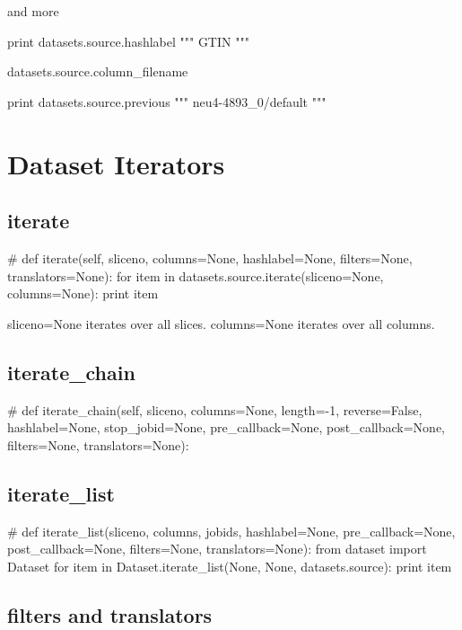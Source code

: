 and more

\begin{python}
  print datasets.source.hashlabel
  """
GTIN
"""
\end{python}
\begin{python}
datasets.source.column\_filename
\end{python}

\begin{python}
  print datasets.source.previous
  """
neu4-4893_0/default
"""
\end{python}




\section{Dataset Iterators}

\subsection{iterate}
\begin{python}
# def iterate(self, sliceno, columns=None, hashlabel=None, filters=None, translators=None):
  for item in datasets.source.iterate(sliceno=None, columns=None):
    print item
\end{python}
sliceno=None iterates over all slices.
columns=None iterates over all columns.

\subsection{iterate\_chain}
\begin{python}
# def iterate_chain(self, sliceno, columns=None, length=-1, reverse=False, hashlabel=None, stop_jobid=None, pre_callback=None, post_callback=None, filters=None, translators=None):
\end{python}



\subsection{iterate\_list}
\begin{python}
  # def iterate_list(sliceno, columns, jobids, hashlabel=None, pre_callback=None, post_callback=None, filters=None, translators=None):
  from dataset import Dataset
  for item in Dataset.iterate_list(None, None, datasets.source):
    print item
\end{python}

\subsection{filters and translators}

